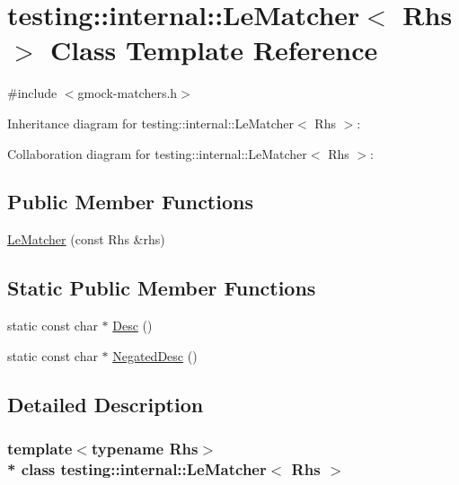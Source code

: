 \hypertarget{classtesting_1_1internal_1_1_le_matcher}{}\section{testing\+:\+:internal\+:\+:Le\+Matcher$<$ Rhs $>$ Class Template Reference}
\label{classtesting_1_1internal_1_1_le_matcher}


{\ttfamily \#include $<$gmock-\/matchers.\+h$>$}



Inheritance diagram for testing\+:\+:internal\+:\+:Le\+Matcher$<$ Rhs $>$\+:


Collaboration diagram for testing\+:\+:internal\+:\+:Le\+Matcher$<$ Rhs $>$\+:
\subsection*{Public Member Functions}
\begin{DoxyCompactItemize}
\item 
\hyperlink{classtesting_1_1internal_1_1_le_matcher_ae3dce3765263397fa5de202d45d0bdb5}{Le\+Matcher} (const Rhs \&rhs)
\end{DoxyCompactItemize}
\subsection*{Static Public Member Functions}
\begin{DoxyCompactItemize}
\item 
static const char $\ast$ \hyperlink{classtesting_1_1internal_1_1_le_matcher_adfef0084cb0f28503a40d7157699519b}{Desc} ()
\item 
static const char $\ast$ \hyperlink{classtesting_1_1internal_1_1_le_matcher_a01dada192b6f7139b66bbc198b3cb03b}{Negated\+Desc} ()
\end{DoxyCompactItemize}


\subsection{Detailed Description}
\subsubsection*{template$<$typename Rhs$>$\\*
class testing\+::internal\+::\+Le\+Matcher$<$ Rhs $>$}



